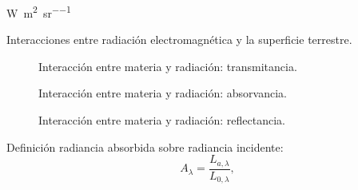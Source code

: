 \begin{frame}{}
\si{\watt\per\square\meter\per\steradian}
\end{frame}


\begin{frame}{}
 Interacciones entre radiación electromagnética y la superficie terrestre.
\end{frame}



\begin{frame}{}
  \begin{figure}
    \centering
    \caption{Interacción entre materia y radiación: transmitancia.}
    \label{}
  \end{figure}
\end{frame}



\begin{frame}{}
  \begin{figure}
    \centering
    \caption{Interacción entre materia y radiación: absorvancia.}
    \label{}
  \end{figure}
\end{frame}


\begin{frame}{}
  \begin{figure}
    \centering
    \caption{Interacción entre materia y radiación: reflectancia.}
    \label{}
  \end{figure}
\end{frame}


\begin{frame}{}
    \begin{block}{Definición}
      radiancia absorbida sobre radiancia incidente:
        \begin{equation}
         A_\lambda = \frac{L_{a,\lambda}}{L_{0,\lambda}} ,
        \end{equation}
         \end{block}
\end{frame}

